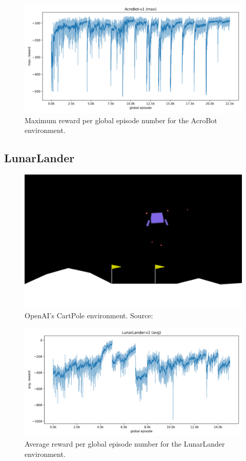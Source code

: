 \documentclass{article}
\begin{document}
\begin{figure}[htbp]
    \centering
    \includegraphics[width=0.9\linewidth]{figs/ab_max_rewards.png}
    \caption{
        Maximum reward per global episode number for the AcroBot environment.
    }
    \label{fig:max-ab}
\end{figure}

\subsection{LunarLander}
\label{ssec:ll}

\begin{figure}[htbp]
    \centering
    \includegraphics[width=0.9\linewidth]{figs/lunarlander.png}
    \caption{
        OpenAI's CartPole environment. 
        Source: \cite{gymlibraryLunarLander}
    }
    \label{fig:lunarlander}
\end{figure}

\begin{figure}[htbp]
    \centering
    \includegraphics[width=0.9\linewidth]{figs/ll_avg_rewards.png}
    \caption{
        Average reward per global episode number for the LunarLander environment.
    }
    \label{fig:avg-ll}
\end{figure}
\end{document}
